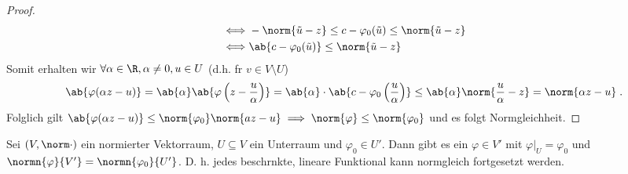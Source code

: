 \begin{proof}
\begin{align*}
			\iff & 	- \norm{\tilde u - z} \leq c - \varphi_0 (\tilde u) \leq \norm{\tilde u -z}	
			\\
			\iff & \ab{c-\varphi_0(\tilde u)} \leq \norm{\tilde u -z}
			\end{align*}
			Somit erhalten wir \(\forall \alpha \in \R, \alpha \neq 0, u \in U\) (d.h. f\us r \(v\in V\setminus U\))
			\[\ab{\varphi(\alpha z -u)} = \ab{\alpha} \ab{\varphi\left(z - \frac{u}{\alpha}\right)} = \ab{\alpha} \cdot \ab{c - \varphi_0\left(\frac{u}{\alpha}\right)} \leq \ab{\alpha}\norm{\frac{u}{\alpha}-z} = \norm{\alpha z -u}\;.\]
			Folglich gilt 
			\(\ab{\varphi(\alpha z -u)} \leq \norm{\varphi_0} \norm{az - u}\implies \norm{\varphi} \leq \norm{\varphi_0}\) und es folgt Normgleichheit.
	\end{proof}
	
\begin{theorem}
	Sei \((V,\norm\cdot)\) ein normierter Vektorraum, \(U\subseteq V\) ein Unterraum und \(\varphi_0 \in U'\). Dann gibt es ein \(\varphi \in V'\) mit \(\varphi\vert_U = \varphi_0\) und \(\normn{\varphi}{V'} = \normn{\varphi_0}{U'}\). D. h. jedes beschr\as nkte, lineare Funktional kann normgleich fortgesetzt werden. 
\end{theorem}
